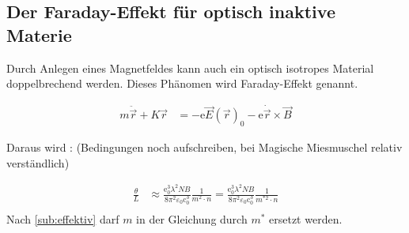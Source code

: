 \subsection{Der Faraday-Effekt für optisch inaktive Materie}
\label{sub:Faraday}
Durch Anlegen eines Magnetfeldes kann auch ein optisch isotropes Material doppelbrechend werden.
Dieses Phänomen wird Faraday-Effekt genannt.

\begin{align}
    m\ddot{\vec{r}}+K\vec{r}&=-\text{e}\vec{E}(\vec{r})_0-\text{e}\dot{\vec{r}}\times\vec{B}
    \label{eqn:klassische_Bewegungsgleichung}
\end{align}

Daraus wird : (Bedingungen noch aufschreiben, bei Magische Miesmuschel relativ verständlich)

\begin{align}
   \frac{\theta}{L}& \approx \frac{\text{e}_0^3\lambda^2 NB}{8\pi^2\varepsilon_0\text{c}_0^3}\frac{1}{m^2 \cdot n} = \frac{\text{e}_0^3\lambda^2 NB}{8\pi^2\varepsilon_0\text{c}_0^3}\frac{1}{m^{*2} \cdot n}\\
    \label{eqn:drehwinkel}
\end{align}
Nach \autoref{sub:effektiv} darf $m$ in der Gleichung durch $m^*$ ersetzt werden.